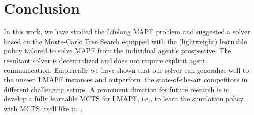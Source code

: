 \documentclass[letterpaper]{article} %
\begin{document}
\section{Conclusion}
In this work, we have studied the Lifelong MAPF problem and suggested a solver based on the Monte-Carlo Tree Search equipped with the (lightweight) learnable policy tailored to solve MAPF from the individual agent's prospective. The resultant solver is decentralized and does not require explicit agent communication. Empirically we have shown that our solver can generalize well to the unseen LMAPF instances and outperform the state-of-the-art competitors in different challenging setups. A prominent direction for future research is to develop a fully learnable MCTS for LMAPF, i.e., to learn the simulation policy with MCTS itself like in~\cite{schrittwieser2020mastering}.


%

\end{document}
